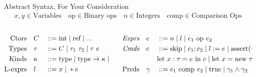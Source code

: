 \documentclass[aspectratio=169]{beamer}
\begin{document}
\begin{frame}{Abstract Syntax, For Your Consideration}
\begin{gather*}
    x,y \in \text{Variables}
    \quad
    \text{op} \in \text{Binary ops}
    \quad
    n \in \text{Integers}
    \quad
    \text{comp} \in \text{Comparison Ops}
\end{gather*}

\vspace{0.2in}

\begin{columns}[T]
\begin{column}{0.45\textwidth}
\begin{alignat*}{2}
\text{Ctors}\quad &C &&::= \text{int} \altm \text{ref} \altm ...
\\
\text{Types}\quad &\tau &&::= C \altm \tau_1 \ \tau_2 \altm \tau\ e
\\
\text{Kinds}\quad & \kappa &&::= \text{type} \altm \text{type} \rightarrow \kappa \altm \tau \rightarrow \kappa
\\
\text{L-exprs} \quad &l &&::= x \altm *e
\end{alignat*}
\end{column}

\begin{column}{0.45\textwidth}
\begin{alignat*}{2}
\textit{Exprs}\quad &e &&::= n \altm l \altm e_1 \text{ op } e_2
\\
\textit{Cmds}\quad &c &&::= \text{skip} \altm c_1;c_2 \altm l := e \altm \text{assert}(\gamma) \altm
\\
~ & ~ && \text{let } x : \tau = e \text { in } c \altm \text{let } x = \text{new } \tau(e) \text{ in } c
\\
\text{Preds}\quad &\gamma &&::= e_1 \text{ comp } e_2 \altm \text{true} \altm \gamma_1 \wedge \gamma_2
\end{alignat*}
\end{column}
\end{columns}

\vspace{0.1in}
\end{frame}

\end{document}
